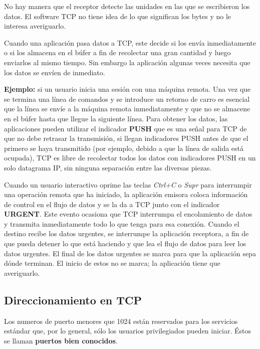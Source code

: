 \documentclass[10pt,a4paper]{report}
\begin{document}
\par No hay manera que el receptor detecte las unidades en las que se escribieron los 
datos. El software TCP no tiene idea de lo que significan los bytes y no le interesa 
averiguarlo.

\par Cuando una aplicación pasa datos a TCP, este decide si los envía inmediatamente 
o si los almacena en el búfer a fin de recolectar una gran cantidad y luego enviarlos al 
mismo tiempo. Sin embargo la aplicación algunas veces necesita que los datos se 
envíen de inmediato.

\textbf{Ejemplo:} si un usuario inicia una sesión con una máquina remota. Una vez que 
se termina una línea de comandos y se introduce un retorno de carro es esencial que la 
línea se envíe a la máquina remota inmediatamente y que no se almacene en el búfer 
hasta que llegue la siguiente línea. Para obtener los datos, las aplicaciones pueden 
utilizar el indicador \textbf{PUSH} que es una señal para TCP de que no debe retrasar 
la transmisión, si llegan indicadores PUSH antes de que el primero se haya transmitido 
(por ejemplo, debido a que la línea de salida está ocupada), TCP es libre de recolectar 
todos los datos con indicadores PUSH en un solo datagrama IP, sin ninguna separación 
entre las diversas piezas.

Cuando un usuario interactivo oprime las teclas \emph{Ctrl+C} o \textit{Supr} para 
interrumpir una operación remota que ha iniciado, la aplicación emisora coloca 
información de control en el flujo de datos y se la da a TCP junto con el indicador 
\textbf{URGENT}. Este evento ocasiona que TCP interrumpa el encolamiento de datos 
y transmita inmediatamente todo lo que tenga para esa conexión. Cuando el destino 
recibe los datos urgentes, se interrumpe la aplicación receptora, a fin de que pueda 
detener lo que está haciendo y que lea el flujo de datos para leer los datos urgentes.
El final de los datos urgentes se marca para que la aplicación sepa dónde terminan.
El inicio de estos no se marca; la aplicación tiene que averiguarlo.

\subsection{Direccionamiento en TCP}
\par Los numeros de puerto menores que 1024 están reservados para los servicios 
estándar que, por lo general, sólo los usuarios privilegiados pueden iniciar. Éstos se 
llaman \textbf{puertos bien conocidos}.
\end{document}
